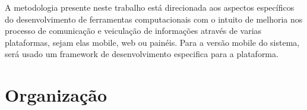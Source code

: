 
A metodologia presente neste trabalho está direcionada aos aspectos específicos	do desenvolvimento de ferramentas computacionais com o intuito de melhoria nos processo de comunicação e veiculação de informações através de varias plataformas, sejam elas mobile, web ou painéis. Para a versão mobile do sistema, será usado um framework de desenvolvimento especifica para a plataforma.


\section{Organização}
